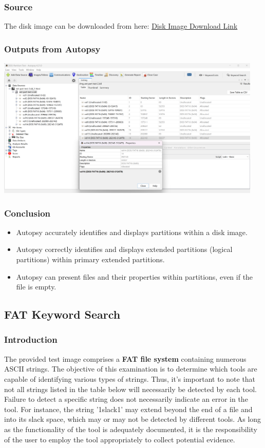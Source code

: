 \documentclass{article}
\begin{document}
\subsubsection*{Source}
The disk image can be downloaded from here: \href{http://prdownloads.sourceforge.net/dftt/1-extend-part.zip?download}{Disk Image Download Link}

\subsubsection*{Outputs from Autopsy}
\begin{center}
    \includegraphics[width=0.95\textwidth]{6/6.1/Extended DOS Partition.png}
\end{center}

\subsubsection*{Conclusion}
\begin{itemize}
    \item Autopsy accurately identifies and displays partitions within a disk image.
    \item Autopsy correctly identifies and displays extended partitions (logical partitions) within primary extended partitions.
    \item Autopsy can present files and their properties within partitions, even if the file is empty.
\end{itemize}

\subsection{FAT Keyword Search}
\subsubsection*{Introduction}
The provided test image comprises a \textbf{FAT file system} containing numerous ASCII strings. The objective of this examination is to determine which tools are capable of identifying various types of strings. Thus, it's important to note that not all strings listed in the table below will necessarily be detected by each tool. Failure to detect a specific string does not necessarily indicate an error in the tool. For instance, the string '1slack1' may extend beyond the end of a file and into its slack space, which may or may not be detected by different tools. As long as the functionality of the tool is adequately documented, it is the responsibility of the user to employ the tool appropriately to collect potential evidence.
\end{document}
